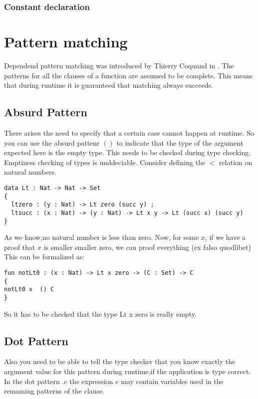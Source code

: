 \subsubsection{Constant declaration}

\section{Pattern matching}
Dependend pattern matching was introduced by Thierry Coquand in \cite{coquand92pattern}.
The patterns for all the clauses of a function are assumed to be complete. This means that during runtime
it is guaranteed that matching always succeeds.


\subsection{Absurd Pattern}
There arises the need to specify that a certain case cannot happen at runtime.
So you can use the absurd pattenr $ () $ to indicate that the type of the argument expected here is the empty type.
This needs to be checked during type checking. Emptiness checking of types is unddeciable.
Consider defining the $ < $ relation on natural numbers.

\begin{verbatim}
data Lt : Nat -> Nat -> Set
{
  ltzero : (y : Nat) -> Lt zero (succ y) ;
  ltsucc : (x : Nat) -> (y : Nat) -> Lt x y -> Lt (succ x) (succ y)
}

\end{verbatim}

As we know,no natural number is less than zero.
Now, for some $x$, if we have a proof that $x$ is smaller smaller zero, we can proof everything (ex falso quodlibet)
This can be formalized as:

\begin{verbatim}
fun notLt0 : (x : Nat) -> Lt x zero -> (C : Set) -> C
{
notLt0 x  () C 
}
\end{verbatim}
So it has to be checked that the type Lt x zero is really empty.

\subsection{Dot Pattern}
Also you need to be able to tell the type checker that you know exactly the argument value for this pattern during runtime,if the application is type correct.
In the dot pattern $ . e $ the expression $ e $ may contain variables used in the remaming patterns of the clause.

